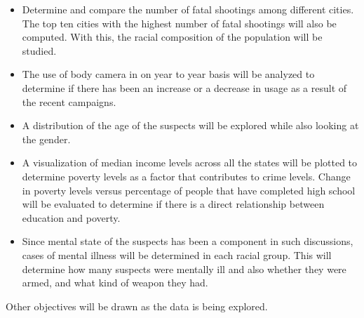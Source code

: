 \documentclass[a4paper,12pt]{article}
\begin{document}
\begin{itemize}
  \item Determine and compare the number of fatal shootings among different cities. The top ten cities with the highest number of fatal shootings will also be computed. With this, the racial composition of the population will be studied.
  \item The use of body camera in on year to year basis will be analyzed to determine if there has been an increase or a decrease in usage as a result of the recent campaigns.
  \item A distribution of the age of the suspects will be explored while also looking at the gender.
  \item A visualization of median income levels across all the states will be plotted to determine poverty levels as a factor that contributes to crime levels. Change in poverty levels versus percentage of people that have completed high school will be evaluated to determine if there is a direct relationship between education and poverty.
  \item Since mental state of the suspects has been a component in such discussions, cases of mental illness will be determined in each racial group. This will determine how many suspects were mentally ill and also whether they were armed, and what kind of weapon they had.
\end{itemize}
Other objectives will be drawn as the data is being explored.



\end{document}
